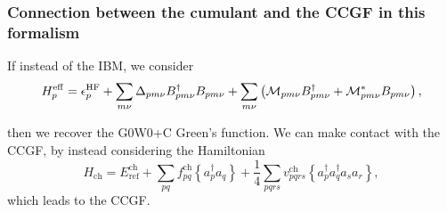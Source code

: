 \begin{frame}
    \frametitle{Connection between the cumulant and the CCGF in this formalism}
If instead of the IBM, we consider
\begin{equation}
H_p^{\rm eff}
=
\epsilon_p^{\rm HF}
+
\sum_{m\nu}
\Delta_{pm\nu}
B_{pm\nu}^{\dagger}
B_{pm\nu}
+
\sum_{m\nu}
\left(
\mathcal{M}_{pm\nu}
B_{pm\nu}^{\dagger}
+
\mathcal{M}_{pm\nu}^{*}
B_{pm\nu}
\right),
\end{equation}

then we recover the G0W0+C Green's function. \pause We can make contact with the CCGF, by instead considering the Hamiltonian
\begin{equation}
H_{\mathrm{ch}}=E_{\mathrm{ref}}^{\mathrm{ch}}+\sum_{p q} f_{p q}^{\mathrm{ch}}\left\{a_p^{\dagger} a_q\right\}+\frac{1}{4} \sum_{p q r s} v_{p q r s}^{\mathrm{ch}}\left\{a_p^{\dagger} a_q^{\dagger} a_s a_r\right\},
\end{equation}
which leads to the CCGF.
\end{frame}

